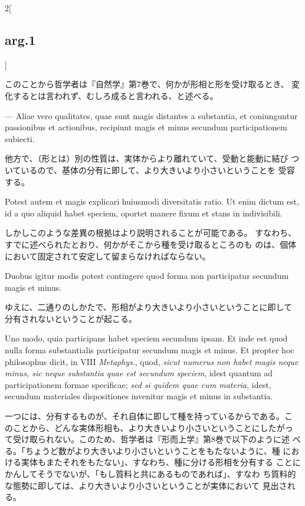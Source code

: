 \documentclass[paper=a4paper,fontsize=10pt,jafontsize=9pt,titlepage]{jlreq}
\begin{document}
\begin{paracol}{2}[\subsection{arg.1}]
\switchcolumn

このことから哲学者は『自然学』第7巻で、何かが形相と形を受け取るとき、
 変化するとは言われず、むしろ成ると言われる、と述べる。

\switchcolumn*

--- Aliae vero qualitates,
quae sunt magis distantes a substantia, et coniunguntur passionibus et
actionibus, recipiunt magis et minus secundum participationem
subiecti.

\switchcolumn

他方で、（形とは）別の性質は、実体からより離れていて、受動と能動に結び
 ついているので、基体の分有に即して、より大きいより小さいということを
 受容する。

\switchcolumn*

Potest autem et magis explicari huiusmodi diversitatis
ratio. Ut enim dictum est, id a quo aliquid habet speciem, oportet
manere fixum et stans in indivisibili.

\switchcolumn

しかしこのような差異の根拠はより説明されることが可能である。
すなわち、すでに述べられたとおり、何かがそこから種を受け取るところのも
のは、個体において固定されて安定して留まらなければならない。

\switchcolumn*

Duobus igitur modis potest
contingere quod forma non participatur secundum magis et minus.

\switchcolumn

ゆえに、二通りのしかたで、形相がより大きいより小さいということに即して
分有されないということが起こる。

\switchcolumn*

Uno modo, quia participans habet speciem secundum ipsam.  Et inde est
quod nulla forma substantialis participatur secundum magis et
minus. Et propter hoc philosophus dicit, in VIII {\itshape Metaphys}.,
quod, {\itshape sicut numerus non habet magis neque minus, sic neque
substantia quae est secundum speciem}, idest quantum ad
participationem formae specificae; {\itshape sed si quidem quae cum
materia}, idest, secundum materiales dispositiones invenitur magis et
minus in substantia.

\switchcolumn

一つには、分有するものが、それ自体に即して種を持っているからである。こ
のことから、どんな実体形相も、より大きいより小さいということにしたがっ
て受け取られない。このため、哲学者は『形而上学』第8巻で以下のように述
べる。「ちょうど数がより大きいより小さいということをもたないように、種
における実体もまたそれをもたない」、すなわち、種に分ける形相を分有する
ことにかんしてそうでないが、「もし質料と共にあるものであれば」、すなわ
ち質料的な態勢に即しては、より大きいより小さいということが実体において
見出される。


\end{paracol}
\end{document}
